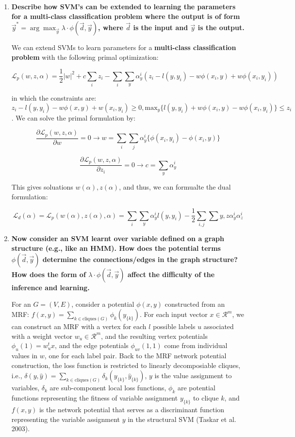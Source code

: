 \documentclass[10pt,onecolumn,letterpaper]{article}
\begin{document}
\begin{enumerate}

\item  \textbf{Describe how SVM's can be extended to learning the parameters for a multi-class classification problem where the output is of form $\vec y ^{\ast} = \arg \max _{\vec y} \lambda \cdot \phi (\vec d, \vec y)$, where $\vec d$ is the input and $\vec y$ is the output.}

We can extend SVMs to learn parameters for a \textbf{multi-class classification problem} with the following primal optimization:

$$ \mathcal{L}_p(w,z,\alpha) = \frac{1}{2}|w|^2 + c\sum_iz_i-\sum_i\sum_y\alpha_y^i(z_i-l(y,y_i)-w\phi(x_i,y)+w\phi(x_i,y_i))$$

in which the constraints are: $z_i-l(y,y_i)-w\phi(x,y)+w(x_i,y_i)\geq 0, \text{max}_y\{l(y,y_i)+w\phi(x_i,y)-w\phi(x_i,y_i)\} \leq z_i$. We can solve the primal formulation by:

$$ \dfrac{\partial \mathcal{L}_p(w,z,\alpha)}{\partial w} = 0 \rightarrow w = \sum_i\sum_j\alpha_y^i\{\phi(x_i,y_i)-\phi(x_i,y)\}$$

$$ \dfrac{\partial \mathcal{L}_p(w,z,\alpha)}{\partial z_i} = 0 \rightarrow c = \sum_y\alpha_y^i$$

This gives soluations $w(\alpha),z(\alpha)$, and thus, we can formualte the dual formulation:

$$ \mathcal{L}_d(\alpha) = \mathcal{L}_p(w(\alpha),z(\alpha),\alpha) = \sum_i\sum_y\alpha_y^il(y,y_i) - \frac{1}{2}\sum_{i,j}\sum y,z\alpha_y^i\alpha_z^i $$


\item \textbf{Now consider an SVM learnt over variable defined on a graph structure (e.g., like an HMM). How does the potential terms $\phi (\vec d, \vec y)$ determine the connections/edges in the graph structure? How does the form of $\lambda \cdot \phi (\vec d, \vec y)$ affect the difficulty of the inference and learning.}

For an  $G=(V,E)$, consider a potential $\phi(x,y)$ constructed from an MRF: $f(x,y) = \sum_{k\in\text{cliques}(G)}\phi_k(y_{\{k\}})$. For each input vector $x \in \mathcal{R}^m$, we can construct an MRF with a vertex for each $l$ possible labels $u$ associated with a weight vector $w_u \in \mathcal{R}^m$, and the resulting vertex potentials $\phi_u(1) = w_u^tx$, and the edge potentials $\phi_{uv}(1,1)$ come from individual values in $w$, one for each label pair. Back to the MRF network potential construction, the loss function is restricted to linearly decomposiable cliques, i.e., $\delta(y,\widehat{y}) = \sum_{k\in\text{cliques}(G)} \delta_k(y_{\{k\}},\widehat{y}_{\{k\}})$, $y$ is the value assignment to variables, $\delta_k$ are sub-component local loss functions, $\phi_k$ are potential functions representing the fitness of variable assignment $y_{\{k\}}$ to clique $k$, and $f(x,y)$ is the network potential that serves as a discriminant function representing the variable assignment $y$ in the structural SVM (Taskar et al. 2003).


\end{enumerate}
\end{document}
